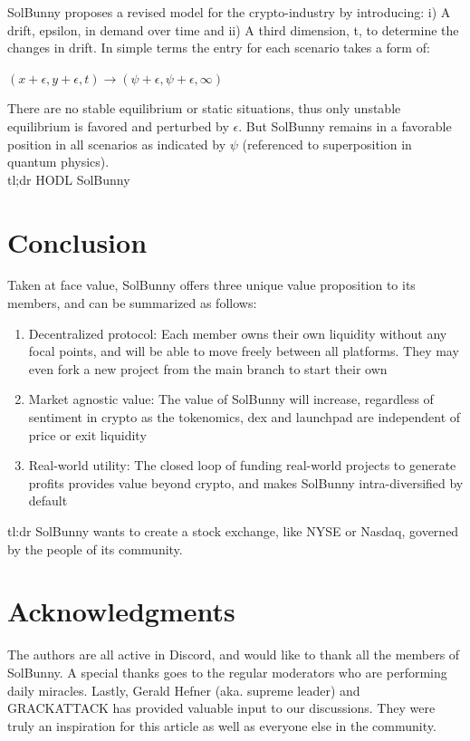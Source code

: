 \documentclass[12pt]{article}
\begin{document}
SolBunny proposes a revised model for the crypto-industry by introducing: i) A drift, epsilon, in demand over time and ii) A third dimension, t, to determine the changes in drift. In simple terms the entry for each scenario takes a form of: 

$(x+\epsilon, y+ \epsilon, t) \rightarrow (\psi+\epsilon, \psi+ \epsilon, \infty)$

There are no stable equilibrium or static situations, thus only unstable equilibrium is favored and perturbed by $\epsilon$. But SolBunny remains in a favorable position in all scenarios as indicated by $\psi$ (referenced to superposition in quantum physics). \\

tl;dr HODL SolBunny

\clearpage


\section*{Conclusion}

Taken at face value, SolBunny offers three unique value proposition to its members, and can be summarized as follows:

\begin{enumerate}

\item Decentralized protocol: Each member owns their own liquidity without any focal points, and will be able to move freely between all platforms. They may even fork a new project from the main branch to start their own

\item Market agnostic value: The value of SolBunny will increase, regardless of sentiment in crypto as the tokenomics, dex and launchpad are independent of price or exit liquidity

\item Real-world utility: The closed loop of funding real-world projects to generate profits provides value beyond crypto, and makes SolBunny intra-diversified by default

\end{enumerate}

tl:dr SolBunny wants to create a stock exchange, like NYSE or Nasdaq, governed by the people of its community.


\clearpage

\section*{Acknowledgments}
The authors are all active in Discord, and would like to thank all the members of SolBunny. A special thanks goes to the regular moderators who are performing daily miracles. Lastly, Gerald Hefner (aka. supreme leader) and GRACKATTACK has provided valuable input to our discussions. They were truly an inspiration for this article as well as everyone else in the community.
\end{document}
